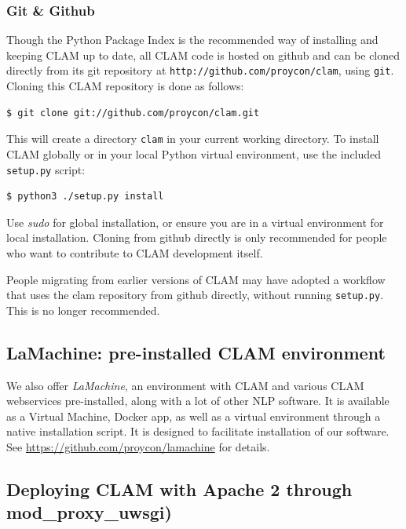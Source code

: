 \documentclass[a4paper,12pt,twoside,openright]{report}
\begin{document}
\subsubsection{Git \& Github}

Though the Python Package Index is the recommended way of installing and
keeping CLAM up to date, all CLAM code is hosted on github and can be
cloned directly from its git repository at
\texttt{http://github.com/proycon/clam}, using \texttt{git}. Cloning this CLAM
repository is done as follows:

{ \small
\begin{verbatim}
$ git clone git://github.com/proycon/clam.git
\end{verbatim}
}
 
This will create a directory \texttt{clam} in your current working directory.
To install CLAM globally or in your local Python virtual environment, use the
included \texttt{setup.py} script:

{ \small
\begin{verbatim}
$ python3 ./setup.py install
\end{verbatim}
}

Use \emph{sudo} for global installation, or ensure you are in a virtual
environment for local installation. Cloning from github directly is only
recommended for people who want to contribute to CLAM development itself.

People migrating from earlier versions of CLAM may have adopted a
workflow that uses the clam repository from github directly, without running
\texttt{setup.py}. This is no longer recommended.

\subsection{LaMachine: pre-installed CLAM environment}

We also offer \emph{LaMachine}, an environment with CLAM and various CLAM
webservices pre-installed, along with a lot of other NLP software. It is available
as a Virtual Machine, Docker app, as well as a virtual environment through a
native installation script. It is designed to facilitate installation of our
software. See \url{https://github.com/proycon/lamachine} for
details. 

\subsection{Deploying CLAM with Apache 2 through mod\_proxy\_uwsgi)}
\label{sec:uwsgi}
\end{document}
